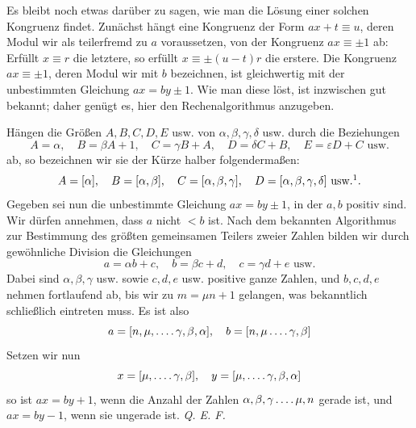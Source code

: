 
Es bleibt noch etwas darüber zu sagen, wie man die Lösung einer solchen Kongruenz findet. Zunächst hängt eine Kongruenz der Form $ax+t \equiv u$, deren Modul wir als teilerfremd zu $a$ voraussetzen, von der Kongruenz $ax \equiv \pm 1$ ab: Erfüllt $x \equiv r$ die letztere, so erfüllt $x \equiv \pm(u-t)r$ die erstere. Die Kongruenz $ax \equiv \pm 1$, deren Modul wir mit $b$ bezeichnen, ist gleichwertig mit der unbestimmten Gleichung $ax = by \pm 1$. Wie man diese löst, ist inzwischen gut bekannt; daher genügt es, hier den Rechenalgorithmus anzugeben.

Hängen die Größen $A, B, C, D, E$ usw. von $\alpha, \beta, \gamma, \delta$ usw. durch die Beziehungen
\[
A = \alpha, \quad B = \beta A + 1, \quad C = \gamma B + A, \quad D = \delta C + B, \quad
E = \varepsilon D + C \text{ usw.}
\]
ab, so bezeichnen wir sie der Kürze halber folgendermaßen:
\begingroup
\renewcommand{\thefootnote}{*)}
\[
A = [\alpha], \quad B = [\alpha, \beta], \quad C = [\alpha, \beta, \gamma], \quad
D = [\alpha, \beta, \gamma, \delta] \text{ usw.}\footnotemark.
\]
\endgroup
Gegeben sei nun die unbestimmte Gleichung $ax = by \pm 1$, in der $a, b$ positiv sind. Wir dürfen annehmen, dass $a$ nicht $< b$ ist. Nach dem bekannten Algorithmus zur Bestimmung des größten gemeinsamen Teilers zweier Zahlen bilden wir durch gewöhnliche Division die Gleichungen
\[
a = \alpha b + c, \quad b = \beta c + d, \quad c = \gamma d + e \text{ usw.}
\]
Dabei sind $\alpha, \beta, \gamma$ usw. sowie $c, d, e$ usw. positive ganze Zahlen, und $b, c, d, e$ nehmen fortlaufend ab, bis wir zu $m = \mu n + 1$ gelangen,
was bekanntlich schließlich eintreten muss. Es ist also
\[
a=[n,\mu,\mathinner{\ldotp\ldotp\ldotp\ldotp} \gamma,\beta,\alpha], \quad b=[n,\mu\mathinner{\ldotp\ldotp\ldotp\ldotp} \gamma,\beta]
\]
Setzen wir nun
\[
x=[\mu,\mathinner{\ldotp\ldotp\ldotp\ldotp} \gamma,\beta], \quad y=[\mu,\mathinner{\ldotp\ldotp\ldotp\ldotp} \gamma,\beta,\alpha]
\]
so ist $ax=by+1$, wenn die Anzahl der Zahlen $\alpha,\beta,\gamma\mathinner{\ldotp\ldotp\ldotp\ldotp} \mu,n$ gerade ist, und $ax=by-1$, wenn sie ungerade ist. \emph{Q. E. F.}

